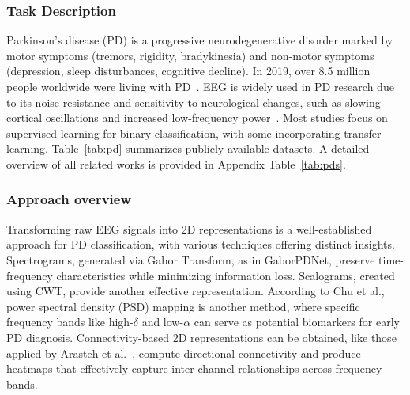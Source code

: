 \subsubsection{Task Description}
Parkinson’s disease (PD) is a progressive neurodegenerative disorder marked by motor symptoms (tremors, rigidity, bradykinesia) and non-motor symptoms (depression, sleep disturbances, cognitive decline). In 2019, over 8.5 million people worldwide were living with PD~\cite{who2023parkinson}.
EEG is widely used in PD research due to its noise resistance and sensitivity to neurological changes, such as slowing cortical oscillations and increased low-frequency power~\cite{morita2011relationship}. 
Most studies focus on supervised learning for binary classification, with some incorporating transfer learning. 
Table~\ref{tab:pd} summarizes publicly available datasets.
A detailed overview of all related works is provided in Appendix Table~\ref{tab:pds}.

\subsubsection{Approach overview}
Transforming raw EEG signals into 2D representations is a well-established approach for PD classification, with various techniques offering distinct insights.
Spectrograms, generated via Gabor Transform, as in GaborPDNet\cite{PD2}, preserve time-frequency characteristics while minimizing information loss. 
Scalograms, created using CWT, provide another effective representation\cite{shaban2022resting}.
According to Chu et al.\cite{PD8}, power spectral density (PSD) mapping is another method, where specific frequency bands like high-$\delta$ and low-$\alpha$ can serve as potential biomarkers for early PD diagnosis.
Connectivity-based 2D representations can be obtained, like those applied by Arasteh et al.~\cite{PD9},  compute directional connectivity and produce heatmaps that effectively capture inter-channel relationships across frequency bands.

